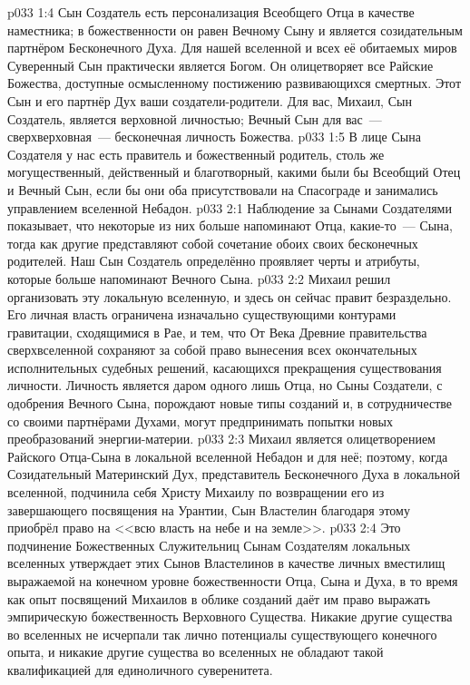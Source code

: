 \vs p033 1:4 Сын Создатель есть персонализация Всеобщего Отца в качестве наместника; в божественности он равен Вечному Сыну и является созидательным партнёром Бесконечного Духа. Для нашей вселенной и всех её обитаемых миров Суверенный Сын практически является Богом. Он олицетворяет все Райские Божества, доступные осмысленному постижению развивающихся смертных. Этот Сын и его партнёр Дух  ваши создатели\hyp{}родители. Для вас, Михаил, Сын Создатель, является верховной личностью; Вечный Сын для вас~--- сверхверховная~--- бесконечная личность Божества.
\vs p033 1:5 \pc В лице Сына Создателя у нас есть правитель и божественный родитель, столь же могущественный, действенный и благотворный, какими были бы Всеобщий Отец и Вечный Сын, если бы они оба присутствовали на Спасограде и занимались управлением вселенной Небадон.
\vs p033 2:1 Наблюдение за Сынами Создателями показывает, что некоторые из них больше напоминают Отца, какие\hyp{}то~--- Сына, тогда как другие представляют собой сочетание обоих своих бесконечных родителей. Наш Сын Создатель определённо проявляет черты и атрибуты, которые больше напоминают Вечного Сына.
\vs p033 2:2 Михаил решил организовать эту локальную вселенную, и здесь он сейчас правит безраздельно. Его личная власть ограничена изначально существующими контурами гравитации, сходящимися в Рае, и тем, что От Века Древние правительства сверхвселенной сохраняют за собой право вынесения всех окончательных исполнительных судебных решений, касающихся прекращения существования личности. Личность является даром одного лишь Отца, но Сыны Создатели, с одобрения Вечного Сына, порождают новые типы созданий и, в сотрудничестве со своими партнёрами Духами, могут предпринимать попытки новых преобразований энергии\hyp{}материи.
\vs p033 2:3 \pc Михаил является олицетворением Райского Отца\hyp{}Сына в локальной вселенной Небадон и для неё; поэтому, когда Созидательный Материнский Дух, представитель Бесконечного Духа в локальной вселенной, подчинила себя Христу Михаилу по возвращении его из завершающего посвящения на Урантии, Сын Властелин благодаря этому приобрёл право на <<всю власть на небе и на земле>>.
\vs p033 2:4 Это подчинение Божественных Служительниц Сынам Создателям локальных вселенных утверждает этих Сынов Властелинов в качестве личных вместилищ выражаемой на конечном уровне божественности Отца, Сына и Духа, в то время как опыт посвящений Михаилов в облике созданий даёт им право выражать эмпирическую божественность Верховного Существа. Никакие другие существа во вселенных не исчерпали так лично потенциалы существующего конечного опыта, и никакие другие существа во вселенных не обладают такой квалификацией для единоличного суверенитета.
